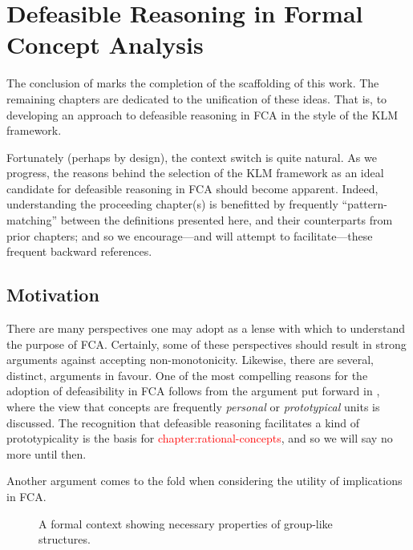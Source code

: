 \chapter{Defeasible Reasoning in Formal Concept Analysis}
\label{chapter:defeasible-reasoning-in-fca}

The conclusion of  marks the completion of the scaffolding of this work. The remaining chapters are dedicated to the unification of these ideas. That is, to developing an approach to defeasible reasoning in FCA in the style of the KLM framework.

Fortunately (perhaps by design), the context switch is quite natural. As we progress, the reasons behind the
selection of the KLM framework as an ideal candidate for defeasible reasoning in FCA should become apparent. Indeed,
understanding the proceeding chapter(s) is benefitted by frequently ``pattern-matching'' between the definitions presented
here, and their counterparts from prior chapters; and so we encourage---and will attempt to facilitate---these frequent backward
references.

\section{Motivation}
\label{section:motivation}

There are many perspectives one may adopt as a lense with which to understand the purpose of FCA. Certainly, some of these
perspectives should result in strong arguments against accepting non-monotonicity. Likewise, there are several, distinct,
arguments in favour. One of the most compelling reasons for the adoption of defeasibility in FCA follows from the argument
put forward in \cite{Wille2005}, where the view that concepts are frequently \textit{personal} or \textit{prototypical}
units is discussed. The recognition that defeasible reasoning facilitates a kind of prototypicality is the basis for \textcolor{red}{chapter:rational-concepts},
and so we will say no more until then.

Another argument comes to the fold when considering the utility of implications in FCA.

\begin{figure}[H]
	\centering
	\small
	\begin{cxt}
		 
		 
		 
		 
		 
		 
		 
		  \end{cxt}
	\caption{A formal context showing necessary properties of group-like
		structures.} \label{context:congressional-voting-records}
\end{figure}


